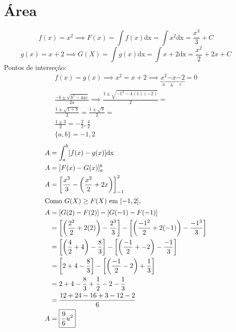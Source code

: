 \documentclass{jhwhw}
\newcommand{\dx}{\mathrm{dx}}
\begin{document}
\part{Área}
\[f(x) = x^2 \implies F(x) = \int f(x) \dx = \int x^2 \dx = \boxed{\frac{x^3}{3} + C}\]
\[g(x) = x+2 \implies G(X) = \int g(x) \dx = \int x+2 \dx = \boxed{\frac{x^2}{2} + 2x + C}\]
Pontos de interseção:
\begin{multline*}
    f(x) = g(x) \implies x^2 = x+2 \implies
    \underbrace{x^2}_a \underbrace{-x}_b \underbrace{-2}_c = 0 \\
    \frac{-b \pm \sqrt{b^2-4ac}}{2a} \implies \frac{1 \pm \sqrt{-1^2 - 4(1)(-2)}}{2} = \\
    \frac{1 \pm \sqrt{1 + 8}}{2} =
    \frac{1 \pm \sqrt{9}}{2} = \\
    \frac{1 \pm 3}{2} =
    -\frac{2}{2}, \frac{4}{2}\\
    \boxed{\{a, b\} = -1, 2}
\end{multline*}
\begin{align*}
    A & = \int_{a}^{b} [f(x) - g(x)] \dx                                                                                                     \\
    A & = [F(x) - G(x)]_a^b                                                                                                                  \\
    A & = \left[\frac{x^3}{3} - \left(\frac{x^2}{2} + 2x\right)\right]_{-1}^2                                                                \\
    \shortintertext{Como $G(X) \geq F(X)$ em $[-1, 2]$,}
    A & = [G(2) - F(2)] - [G(-1) - F(-1)]                                                                                                    \\
      & = \left[\left(\frac{2^2}{2} + 2(2)\right) - \frac{2^3}{3}\right] - \left[\left(\frac{-1^2}{2} + 2(-1)\right) - \frac{-1^3}{3}\right] \\
      & = \left[\left(\frac{4}{2} + 4\right) - \frac{8}{3}\right] - \left[\left(\frac{-1}{2} + -2\right) - \frac{-1}{3}\right]               \\
      & = \left[2 + 4 - \frac{8}{3}\right] - \left[\left(\frac{-1}{2} -2\right) + \frac{1}{3}\right]                                         \\
      & = 2 + 4 - \frac{8}{3} + \frac{1}{2} - 2 - \frac{1}{3}                                                                                \\
      & = \frac{12 + 24 - 16 + 3 - 12 - 2}{6}                                                                                                \\
    A & = \boxed{\frac{9}{6} u^2}
\end{align*}
\reset
\newpage
{}
\end{document}
